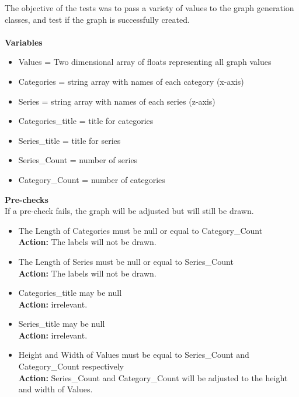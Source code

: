 \documentclass[a4paper,12pt]{article}
\begin{document}
The objective of the tests was to pass a variety of values to the graph generation classes, and test if the graph is successfully created.\\\\
\textbf{Variables}
%
\begin{itemize}
	\item Values = Two dimensional array of floats representing all graph values
	\item Categories = string array with names of each category (x-axis)
	\item Series = string array with names of each series (z-axis)
	\item Categories\_title = title for categories
	\item Series\_title = title for series
	\item Series\_Count = number of series
	\item Category\_Count = number of categories
\end{itemize}
%
\textbf{Pre-checks}\\
If a pre-check fails, the graph will be adjusted but will still be drawn.
%
\begin{itemize}
	\item The Length of Categories must be null or equal to Category\_Count \\
		\textbf{Action:} The labels will not be drawn.
	\item The Length of Series must be null or equal to Series\_Count \\
		\textbf{Action:} The labels will not be drawn.
	\item Categories\_title may be null\\
		\textbf{Action:} irrelevant. 
	\item Series\_title may be null\\
		\textbf{Action:} irrelevant. 
	\item Height and Width of Values must be equal to Series\_Count and Category\_Count respectively\\
		\textbf{Action:} Series\_Count and Category\_Count will be adjusted to the height and width of Values.
\end{itemize}
%
\end{document}
